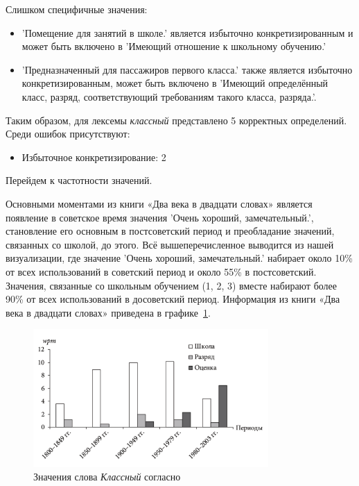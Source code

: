 Слишком специфичные значения:
\begin{itemize}
    \item ’Помещение для занятий в школе.’ является избыточно конкретизированным
и может быть включено в ’Имеющий отношение к школьному обучению.’

    \item ’Предназначенный для пассажиров первого класса.’ также является избыточно конкретизированным,
может быть включено в ’Имеющий определённый класс, разряд, соответствующий требованиям такого класса, разряда.’.
\end{itemize}

Таким образом, для лексемы \textit{классный} представлено 5 корректных определений.
Среди ошибок присутствуют:
\begin{itemize}
    \item Избыточное конкретизирование: 2
\end{itemize}

Перейдем к частотности значений.

Основными моментами из книги «Два века в двадцати словах» является появление
в советское время значения ’Очень хороший, замечательный.’,
становление его основным в постсоветский период и
преобладание значений, связанных со школой, до этого.
Всё вышеперечисленное выводится из нашей визуализации,
где значение ’Очень хороший, замечательный.’ набирает около 10\% от всех
использований в советский период и около 55\% в постсоветский.
Значения, связанные со школьным обучением (1, 2, 3) вместе набирают
более 90\% от всех использований в досоветский период.
Информация из книги «Два века в двадцати словах» приведена в графике~\ref{fig:TwoCenturiesKlassnij}.

\begin{figure}[H]
    \centering %
    \includegraphics[width=0.8\textwidth]{img/book/klassnij/all}
    \caption{Значения слова \textit{Классный} согласно~\cite{TwoCenturies}}
    \label{fig:TwoCenturiesKlassnij}
\end{figure}

